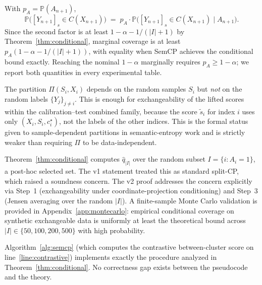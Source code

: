 \begin{remark}
\label{rem:marginal-v2}
With $p_A = \mathbb{P}(A_{n+1})$,
\[
  \mathbb{P}\!\bigl([Y_{n+1}]_s \in C(X_{n+1})\bigr)
  \;=\; p_A \cdot \mathbb{P}\!\bigl([Y_{n+1}]_s \in C(X_{n+1}) \mid A_{n+1}\bigr).
\]
Since the second factor is at least $1 - \alpha - 1/(|I|+1)$ by
Theorem~\ref{thm:conditional}, marginal coverage is at least
$p_A (1 - \alpha - 1/(|I|+1))$, with equality when SemCP achieves the
conditional bound exactly. Reaching the nominal $1-\alpha$ marginally
requires $p_A \ge 1 - \alpha$; we report both quantities in every
experimental table.
\end{remark}

\begin{remark}
\label{rem:partition-v2}
The partition $\Pi(S_i, X_i)$ depends on the random samples $S_i$ but
\emph{not} on the random labels $\{Y_j\}_{j \neq i}$. This is enough for
exchangeability of the lifted scores within the calibration--test
combined family, because the score $\tilde{s}_i$ for index $i$ uses only
$(X_i, S_i, c_i^\star)$, not the labels of the other indices. This is
the formal status given to sample-dependent partitions in
semantic-entropy work \citep{kuhn2023semantic, farquhar2024detecting}
and is strictly weaker than requiring $\Pi$ to be data-independent.
\end{remark}

\begin{remark}
\label{rem:gap-closed}
Theorem~\ref{thm:conditional} computes $\hat{q}_{|I|}$ over the random
subset $I = \{i : A_i = 1\}$, a post-hoc selected set. The v1 statement
treated this as standard split-CP, which raised a soundness concern.
The v2 proof addresses the concern explicitly via Step~1 (exchangeability
under coordinate-projection conditioning) and Step~3 (Jensen averaging
over the random $|I|$). A finite-sample Monte Carlo validation is
provided in Appendix~\ref{app:montecarlo}: empirical conditional
coverage on synthetic exchangeable data is uniformly at least the
theoretical bound across $|I| \in \{50, 100, 200, 500\}$ with high
probability.
\end{remark}

\begin{corollary}
\label{cor:alg-aligned}
Algorithm~\ref{alg:semcp} (which computes the contrastive between-cluster
score on line~\ref{line:contrastive}) implements exactly the procedure
analyzed in Theorem~\ref{thm:conditional}. No correctness gap exists
between the pseudocode and the theory.
\end{corollary}
